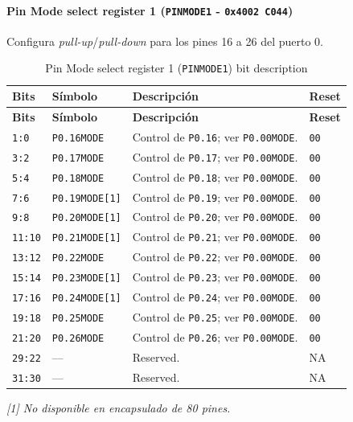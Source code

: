 \paragraph{Pin Mode select register 1 (\texttt{PINMODE1} - \texttt{0x4002 C044})}
Configura \textit{pull-up}/\textit{pull-down} para los pines 16 a 26 del puerto 0.

\begin{longtable}{|>{\raggedright\arraybackslash}p{}|>{\raggedright\arraybackslash}p{}|>{\raggedright\arraybackslash}p{}|>{\centering\arraybackslash}p{}|}
\caption{Pin Mode select register 1 (\texttt{PINMODE1}) bit description}\\
\hline
\textbf{Bits} & \textbf{Símbolo} & \textbf{Descripción} & \textbf{Reset} \\
\hline
\endfirsthead
\hline
\textbf{Bits} & \textbf{Símbolo} & \textbf{Descripción} & \textbf{Reset} \\
\hline
\endhead
\texttt{1:0} & \texttt{P0.16MODE} & Control de \texttt{P0.16}; ver \texttt{P0.00MODE}. & \texttt{00} \\
\hline
\texttt{3:2} & \texttt{P0.17MODE} & Control de \texttt{P0.17}; ver \texttt{P0.00MODE}. & \texttt{00} \\
\hline
\texttt{5:4} & \texttt{P0.18MODE} & Control de \texttt{P0.18}; ver \texttt{P0.00MODE}. & \texttt{00} \\
\hline
\texttt{7:6} & \texttt{P0.19MODE[1]} & Control de \texttt{P0.19}; ver \texttt{P0.00MODE}. & \texttt{00} \\
\hline
\texttt{9:8} & \texttt{P0.20MODE[1]} & Control de \texttt{P0.20}; ver \texttt{P0.00MODE}. & \texttt{00} \\
\hline
\texttt{11:10} & \texttt{P0.21MODE[1]} & Control de \texttt{P0.21}; ver \texttt{P0.00MODE}. & \texttt{00} \\
\hline
\texttt{13:12} & \texttt{P0.22MODE} & Control de \texttt{P0.22}; ver \texttt{P0.00MODE}. & \texttt{00} \\
\hline
\texttt{15:14} & \texttt{P0.23MODE[1]} & Control de \texttt{P0.23}; ver \texttt{P0.00MODE}. & \texttt{00} \\
\hline
\texttt{17:16} & \texttt{P0.24MODE[1]} & Control de \texttt{P0.24}; ver \texttt{P0.00MODE}. & \texttt{00} \\
\hline
\texttt{19:18} & \texttt{P0.25MODE} & Control de \texttt{P0.25}; ver \texttt{P0.00MODE}. & \texttt{00} \\
\hline
\texttt{21:20} & \texttt{P0.26MODE} & Control de \texttt{P0.26}; ver \texttt{P0.00MODE}. & \texttt{00} \\
\hline
\texttt{29:22} & --- & Reserved. & NA \\
\hline
\texttt{31:30} & --- & Reserved. & NA \\
\hline
\end{longtable}
\noindent\textit{[1] No disponible en encapsulado de 80 pines.}

